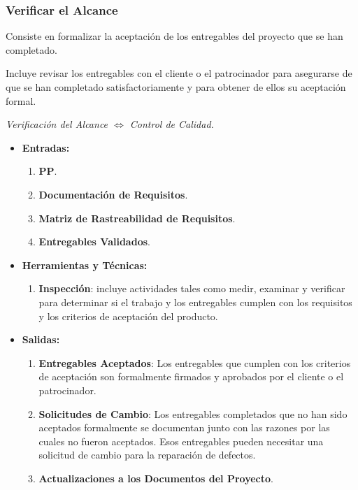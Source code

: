 \documentclass[10pt,a4paper]{article}
\begin{document}
\subsubsection{Verificar el Alcance}
Consiste en formalizar la aceptación de los entregables del proyecto que se han completado.

Incluye revisar los entregables con el cliente o el patrocinador para asegurarse de que se han completado satisfactoriamente y para obtener de ellos su aceptación
formal.

\begin{center}
\textit{Verificación del Alcance $\iff$ Control de Calidad.}
\end{center}

\begin{itemize}
\item \textbf{Entradas:}
\begin{enumerate}
\item \textbf{PP}.
\item \textbf{Documentación de Requisitos}.
\item \textbf{Matriz de Rastreabilidad de Requisitos}.
\item \textbf{Entregables Validados}.
\end{enumerate}

\item \textbf{Herramientas y Técnicas:}
\begin{enumerate}
\item \textbf{Inspección}: incluye actividades tales como medir, examinar y verificar para determinar si el trabajo y los entregables cumplen con los requisitos y los criterios de aceptación del producto.
\end{enumerate}

\item \textbf{Salidas:}
\begin{enumerate}
\item \textbf{Entregables Aceptados}: Los entregables que cumplen con los criterios de aceptación son formalmente firmados y aprobados por el cliente o el patrocinador.
\item \textbf{Solicitudes de Cambio}: Los entregables completados que no han sido aceptados formalmente se documentan junto con las razones por las cuales no fueron aceptados. Esos entregables pueden necesitar una solicitud de cambio para la reparación de defectos.
\item \textbf{Actualizaciones a los Documentos del Proyecto}.
\end{enumerate}
\end{itemize}
\end{document}
